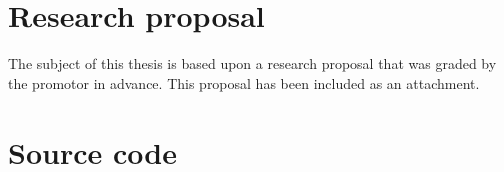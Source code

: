 \documentclass[fleqn,a4paper,12pt]{book}
\begin{document}
\appendix


\chapter{Research proposal}
\label{ch:research-proposal}

The subject of this thesis is based upon a research proposal that was graded by the promotor in advance. This proposal has been included as an attachment.



%

\chapter{Source code}
\label{ch:source-code}




\printbibliography[heading=bibintoc]
\end{document}
